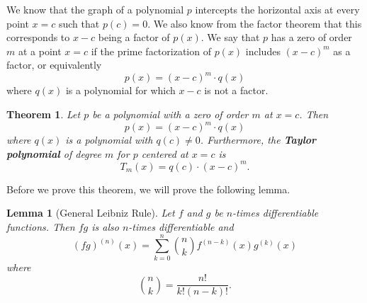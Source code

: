\documentclass[
]{book}
\newtheorem{theorem}{Theorem}[chapter]
\newtheorem{lemma}{Lemma}[chapter]
\theoremstyle{definition}
\theoremstyle{definition}
\theoremstyle{definition}
\theoremstyle{remark}
\begin{document}
We know that the graph of a polynomial \(p\) intercepts the horizontal axis at every point \(x=c\) such that \(p(c)=0\). We also know from the factor theorem that this corresponds to \(x-c\) being a factor of \(p(x)\). We say that \(p\) has a zero of order \(m\) at a point \(x=c\) if the prime factorization of \(p(x)\) includes \((x-c)^m\) as a factor, or equivalently
\[p(x)=(x-c)^m \cdot q(x)\] where \(q(x)\) is a polynomial for which \(x-c\) is not a factor.

\begin{theorem}
\protect\hypertarget{thm:poly-Taylor-zero}{}{\label{thm:poly-Taylor-zero} }Let \(p\) be a polynomial with a zero of order \(m\) at \(x=c\). Then \[p(x)=(x-c)^m \cdot q(x)\] where \(q(x)\) is a polynomial with \(q(c)\neq 0\). Furthermore, the \textbf{Taylor polynomial} of degree \(m\) for \(p\) centered at \(x=c\) is \[T_m(x)= q(c)\cdot (x-c)^m.\]
\end{theorem}

Before we prove this theorem, we will prove the following lemma.

\begin{lemma}[General Leibniz Rule]
\protect\hypertarget{lem:Leibniz-rule}{}{\label{lem:Leibniz-rule} {} }Let \(f\) and \(g\) be \(n\)-times differentiable functions. Then \(fg\) is also \(n\)-times differentiable and
\[(fg)^{(n)} (x) = \sum_{k=0}^n \binom{n}{k} f^{(n-k)}(x) g^{(k)}(x) \] where \[\binom{n}{k} = \frac{n!}{k!(n-k)!}.\]
\end{lemma}
\end{document}
